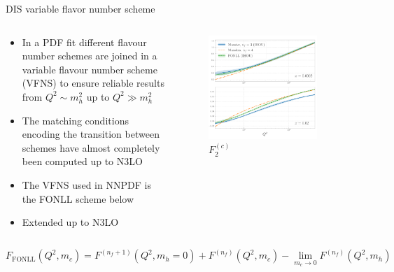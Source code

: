 \documentclass[aspectratio=169, 9pt,t]{beamer}
\begin{document}
\begin{frame}{DIS variable flavor number scheme}
  \begin{columns}
    \begin{column}{0.59\textwidth}
      \begin{itemize}
        \item In a PDF fit different flavour number schemes are joined in a variable flavour number scheme (VFNS) to ensure reliable results from $Q^2\sim m_h^2$ up to $Q^2\gg m_h^2$
        \item The matching conditions encoding the transition between schemes have almost completely been computed up to N3LO
        \item The VFNS used in NNPDF is the FONLL scheme below
        \item Extended up to N3LO
      \end{itemize}
    \end{column}
    \begin{column}{0.39\textwidth}
      \vspace*{-2em}
      \begin{figure}[!t]
        \centering
        \includegraphics[width=0.89\textwidth]{figures/F2_charm_n3lo.pdf}
        \caption*{$F_2^{(c)}$}
      \end{figure}
    \end{column}
  \end{columns}

  \vspace*{1em}
  \begin{equation*}
    F_\mathrm{FONLL}(Q^2,m_c) =F^{(n_f+1)}(Q^2,m_h=0)
    +F^{(n_f)}(Q^2,m_c)-\lim_{m_c\rightarrow 0}F^{(n_f)}(Q^2,m_h)
  \end{equation*}



\end{frame}
\end{document}
